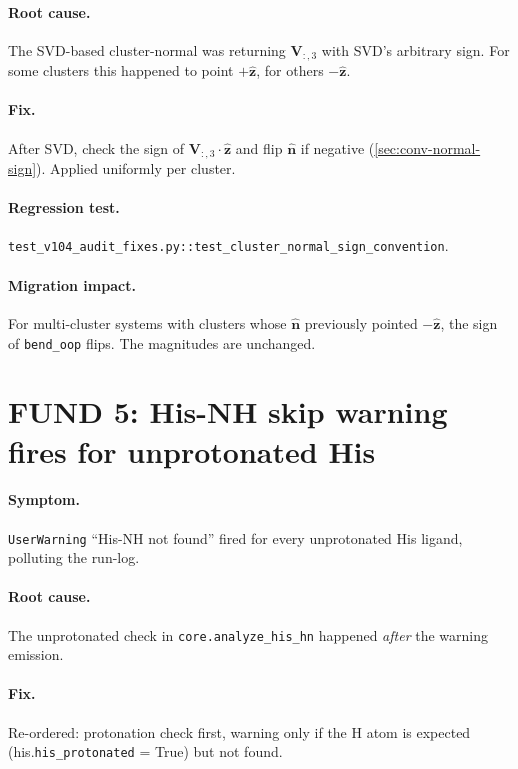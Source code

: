 \documentclass[10pt,a4paper,twoside]{article}
\newcommand{\zhat}{\hat{\mathbf{z}}}
\newcommand{\nhat}{\hat{\mathbf{n}}}
\newcommand{\Vmat}{\mathbf{V}}
\newcommand{\fn}[1]{\texttt{#1}}
\begin{document}
\paragraph{Root cause.}
The SVD-based cluster-normal was returning $\Vmat_{:,3}$ with
SVD's arbitrary sign. For some clusters this happened to point
$+\zhat$, for others $-\zhat$.

\paragraph{Fix.}
After SVD, check the sign of $\Vmat_{:,3} \cdot \zhat$ and flip
$\nhat$ if negative (\cref{sec:conv-normal-sign}). Applied
uniformly per cluster.

\paragraph{Regression test.}
\fn{test\_v104\_audit\_fixes.py::test\_cluster\_normal\_sign\_convention}.

\paragraph{Migration impact.}
For multi-cluster systems with clusters whose $\nhat$ previously
pointed $-\zhat$, the sign of \texttt{bend\_oop} flips. The
magnitudes are unchanged.

\section{FUND 5: His-NH skip warning fires for unprotonated His}
\label{sec:fund-5}

\paragraph{Symptom.}
\fn{UserWarning} ``His-NH not found'' fired for every unprotonated
His ligand, polluting the run-log.

\paragraph{Root cause.}
The unprotonated check in \fn{core.analyze\_his\_hn} happened
\emph{after} the warning emission.

\paragraph{Fix.}
Re-ordered: protonation check first, warning only if the H atom
is expected (his.\fn{his\_protonated} = True) but not found.
\end{document}
